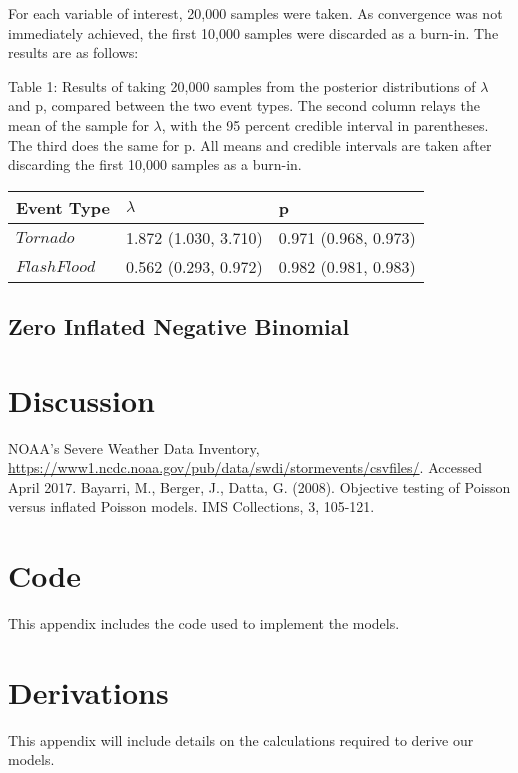 \documentclass{article}
\begin{document}
For each variable of interest, 20,000 samples were taken. As convergence was not immediately achieved, the first 10,000 samples were discarded as a burn-in. The results are as follows: 

\[\]
\noindent Table 1: Results of taking 20,000 samples from the posterior distributions of $\lambda$ and p, compared between the two event types. The second column relays the mean of the sample for $\lambda$, with the 95 percent credible interval in parentheses. The third does the same for p. All means and credible intervals are taken after discarding the first 10,000 samples as a burn-in.

\begin{center}
    \begin{tabular}{| l | l | l |}
    \hline
    Event Type & $\lambda$ & p  \\ \hline
    $Tornado$ & 1.872 (1.030, 3.710) & 0.971 (0.968, 0.973) \\ \hline
    $Flash Flood$ & 0.562 (0.293, 0.972) & 0.982 (0.981, 0.983) \\ \hline
    \end{tabular}
\end{center}

\subsection{Zero Inflated Negative Binomial}
\label{ss:rZiNBinom}

\section{Discussion}
\label{s:discussion}

\begin{thebibliography}{1}
   NOAA's Severe Weather Data Inventory, 
    \url{https://www1.ncdc.noaa.gov/pub/data/swdi/stormevents/csvfiles/}. 
    Accessed April 2017.
   Bayarri, M., Berger, J., Datta, G. (2008). Objective testing of Poisson versus inflated Poisson models. IMS 	Collections, 3, 105-121. 
\end{thebibliography}
\clearpage
\appendix
\section{Code}
\label{a:code}
This appendix includes the code used to implement the models.

\section{Derivations}
\label{a:derivation}
This appendix will include details on the calculations required to derive our models.
\end{document}
